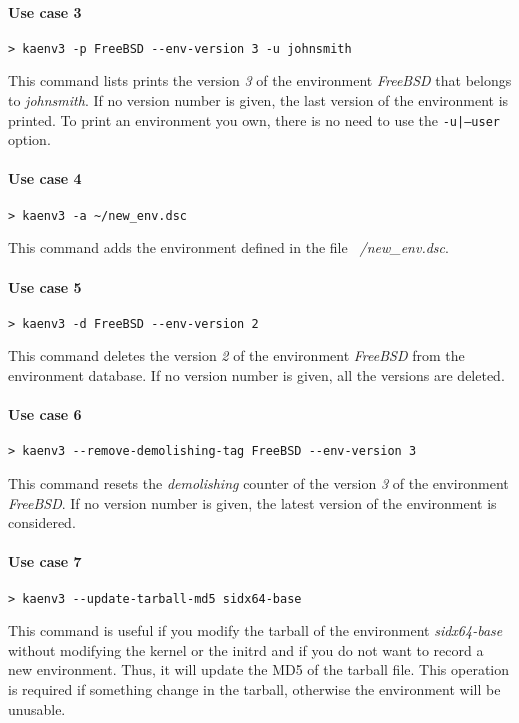 \documentclass[a4wide,10pt,oneside]{book}
\begin{document}
\paragraph{Use case 3}
\begin{verbatim}
> kaenv3 -p FreeBSD --env-version 3 -u johnsmith
\end{verbatim}
This command lists prints the version \textit{3} of the environment \textit{FreeBSD} that belongs to \textit{johnsmith}. If no version number is given, the last version of the environment is printed. To print an environment you own, there is no need to use the \texttt{-u|--user} option.

\paragraph{Use case 4}
\begin{verbatim}
> kaenv3 -a ~/new_env.dsc
\end{verbatim}
This command adds the environment defined in the file \textit{~/new\_env.dsc}. %

\paragraph{Use case 5}
\begin{verbatim}
> kaenv3 -d FreeBSD --env-version 2
\end{verbatim}
This command deletes the version \textit{2} of the environment \textit{FreeBSD} from the environment database. If no version number is given, all the versions are deleted.

\paragraph{Use case 6}
\begin{verbatim}
> kaenv3 --remove-demolishing-tag FreeBSD --env-version 3
\end{verbatim}
This command resets the \textit{demolishing} counter of the version \textit{3} of the environment \textit{FreeBSD}. If no version number is given, the latest version of the environment is considered.

\paragraph{Use case 7}
\begin{verbatim}
> kaenv3 --update-tarball-md5 sidx64-base
\end{verbatim}
This command is useful if you modify the tarball of the environment \textit{sidx64-base} without modifying the kernel or the initrd and if you do not want to record a new environment. Thus, it will update the MD5 of the tarball file. This operation is required if something change in the tarball, otherwise the environment will be unusable.
\end{document}
